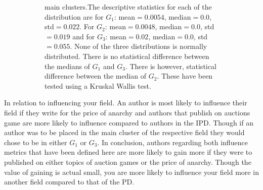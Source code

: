 \documentclass{article}
\theoremstyle{definition}
\begin{document}
\begin{figure}[!hbtp]
\begin{subfigure}{\textwidth}
{        main clusters.The descriptive
        statistics for each of the distribution are for \(G_1\): mean\(=0.0054\),
        median\(=0.0\), std\(=0.022\). For \(G_2\): mean\(=0.0048\), median\(=0.0\),
        std\(=0.019\) and for \(G_3\): mean\(=0.02\), median\(=0.0\), std\(=0.055\).
        None of the three distributions is normally distributed. There is no
        statistical difference between the medians of \(G_1\) and \(G_3\). There
        is however, statistical difference between the median of \(G_2\).
        These have been tested using a Kruskal Wallis test.}\label{fig:betweenness_dist_cluster}
    \end{subfigure}
    \caption{}
\end{figure}

In relation to influencing your field. An author is most likely to influence their
field if they write for the price of anarchy and authors that publish on auctions
game are more likely to influence compared to authors in the IPD.
Though if an author was to be placed in the main cluster of the respective
field they would chose to be in either \(G_1\) or \(G_3\).
In conclusion, authors regarding both influence metrics that have been defined here
are more likely to gain more if they were to published on either topics of auction
games or the price of anarchy. Though the value of gaining is actual small,
you are more likely to influence your field more in another field compared to that
of the PD.
\end{document}
